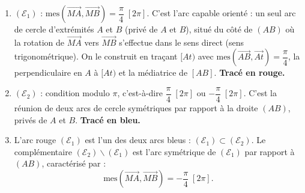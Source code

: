 \documentclass[11pt]{article}
\def\setminus{\mathbin{\backslash}}\let\smallsetminus\setminus
\begin{document}
\begin{corrige}
\begin{enumerate}
\item $(\mathcal{E}_1)$ : $\mathrm{mes}(\overrightarrow{MA}, \overrightarrow{MB}) = \dfrac{\pi}{4} \; [2\pi]$. C'est l'arc capable orienté : un seul arc de cercle d'extrémités $A$ et $B$ (privé de $A$ et $B$), situé du côté de $(AB)$ où la rotation de $\overrightarrow{MA}$ vers $\overrightarrow{MB}$ s'effectue dans le sens direct (sens trigonométrique). On le construit en traçant $[At)$ avec $\mathrm{mes}(\overrightarrow{AB}, \overrightarrow{At}) = \dfrac{\pi}{4}$, la perpendiculaire en $A$ à $[At)$ et la médiatrice de $[AB]$. \textbf{Tracé en rouge.}
\item $(\mathcal{E}_2)$ : condition modulo $\pi$, c'est-à-dire $\dfrac{\pi}{4}\;[2\pi]$ ou $-\dfrac{\pi}{4}\;[2\pi]$. C'est la réunion de deux arcs de cercle symétriques par rapport à la droite $(AB)$, privés de $A$ et $B$. \textbf{Tracé en bleu.}
\item L'arc rouge $(\mathcal{E}_1)$ est l'un des deux arcs bleus : $\boxed{(\mathcal{E}_1) \subset (\mathcal{E}_2)}$. Le complémentaire $(\mathcal{E}_2) \setminus (\mathcal{E}_1)$ est l'arc symétrique de $(\mathcal{E}_1)$ par rapport à $(AB)$, caractérisé par :
\[ \mathrm{mes}(\overrightarrow{MA}, \overrightarrow{MB}) = -\frac{\pi}{4} \; [2\pi]. \]
\end{enumerate}
\end{corrige}
\end{document}
